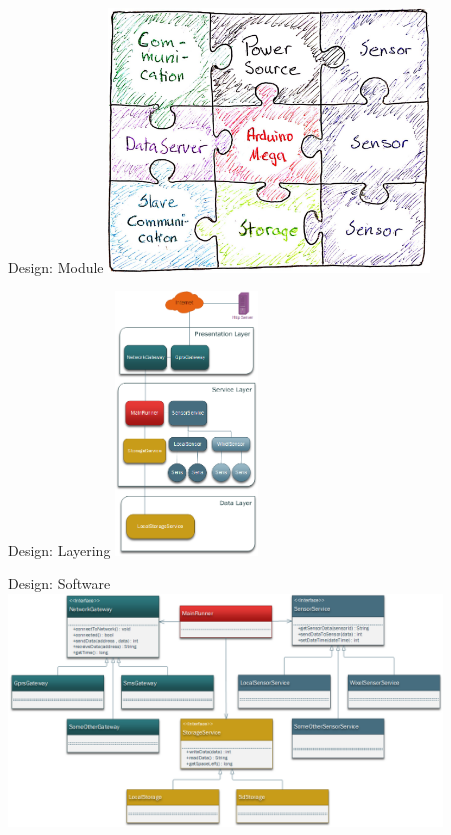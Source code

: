 \documentclass{beamer}
\begin{document}
\begin{frame}{Design: Module}
\centering
\includegraphics[height=7cm]{graphics/Puzzle.png}
\end{frame}

\begin{frame}{Design: Layering}
\centering
\includegraphics[height=7cm]{graphics/Layering.png}
\end{frame}

\begin{frame}{Design: Software}
\centering
\includegraphics[width=11.5cm]{graphics/ClassDiagram.png}
\end{frame}
\end{document}

